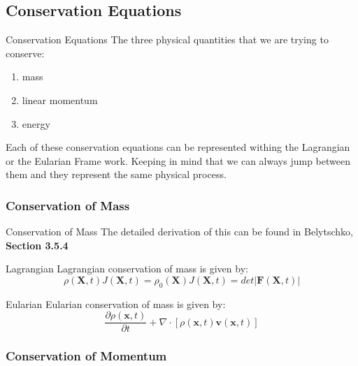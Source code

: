 \documentclass{beamer}
\begin{document}
\subsection{Conservation Equations}
\begin{frame}{Conservation Equations}
	The three physical quantities that we are trying to conserve:
	\begin{enumerate}
		\item mass
		\item linear momentum
		\item energy
	\end{enumerate}
\vspace{1cm}
	Each of these conservation equations can be represented withing the Lagrangian or the Eularian Frame 
    work. Keeping in mind that we can always jump between them and they represent the same physical process.
\end{frame}

\subsubsection{Conservation of Mass}
\begin{frame}{Conservation of Mass}
The detailed derivation of this can be found in Belytschko, \textbf{Section 3.5.4}
	\begin{block}{Lagrangian}
		Lagrangian conservation of mass is given by:
		\begin{subequations}
			\begin{equation}
				\rho(\bm{X},t)J(\bm{X},t)=\rho_{0}(\bm{X})
			\end{equation}
			\begin{equation}
				J(\bm{X},t)=det|\bm{F}(\bm{X},t)|
			\end{equation}
		\end{subequations}
	\end{block}
\begin{block}{Eularian}
	Eularian conservation of mass is given by:
	\begin{equation}
		\frac{\partial \rho(\bm{x},t)}{\partial t}+\nabla\cdot[\rho(\bm{x},t)\bm{v}						(\bm{x},t)]
	\end{equation}
\end{block}
\end{frame}

\subsubsection{Conservation of Momentum}
\end{document}
